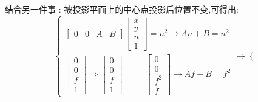 \documentclass[UTF8,12pt]{ctexbook}
\begin{document}
{{{{\begin{itemize}
{\begin{itemize}
{                        结合另一件事 : 被投影平面上的中心点投影后位置不变,可得出:$$
                          \begin{cases}
                            \begin{bmatrix}
                              0 & 0 & A & B
                            \end{bmatrix}
                            \begin{bmatrix}
                              x \\
                              y \\
                              n \\
                              1
                            \end{bmatrix}
                            =
                            n^2
                            \rightarrow
                            An + B = n^2 \\
                            \begin{bmatrix}
                              0 \\
                              0 \\
                              f \\
                              1
                            \end{bmatrix}
                            \Rightarrow
                            \begin{bmatrix}
                              0 \\
                              0 \\
                              f \\
                              1
                            \end{bmatrix}
                            ==
                            \begin{bmatrix}
                              0   \\
                              0   \\
                              f^2 \\
                              f
                            \end{bmatrix}
                            \rightarrow
                            Af + B = f^2
                          \end{cases}
                          \rightarrow
                          \begin{cases}

\end{cases}$$}
\end{itemize}}
\end{itemize}}}}}
\end{document}
